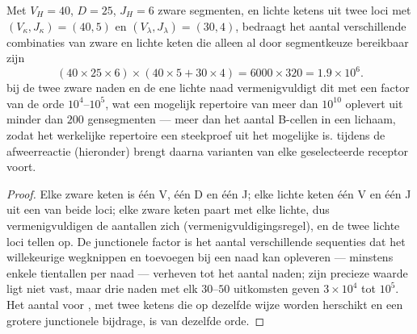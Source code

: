 \begin{theorem}\label{thm:b3:adaptive-immunity:repertoire}
Met $V_{H} = 40$, $D = 25$, $J_{H} = 6$ zware segmenten, en lichte
ketens uit twee loci met $(V_{\kappa}, J_{\kappa}) = (40, 5)$ en
$(V_{\lambda}, J_{\lambda}) = (30, 4)$, bedraagt het aantal
verschillende combinaties van zware en lichte keten die alleen al door
segmentkeuze bereikbaar zijn
\[
(40\times 25\times 6)\times(40\times 5 + 30\times 4) = 6000\times 320
= 1.9\times 10^{6}.
\]
 bij de twee zware naden en de ene lichte naad
vermenigvuldigt dit met een factor van de orde $10^{4}$--$10^{5}$, wat
een mogelijk repertoire van meer dan $10^{10}$ oplevert uit minder dan
$200$ gensegmenten --- meer dan het aantal B-cellen in een lichaam,
zodat het werkelijke repertoire een steekproef uit het mogelijke is.
 tijdens de afweerreactie (hieronder) brengt
daarna varianten van elke geselecteerde receptor voort.
\end{theorem}
\begin{proof}
Elke zware keten is één V, één D en één J; elke lichte keten één V en
één J uit een van beide loci; elke zware keten paart met elke lichte,
dus vermenigvuldigen de aantallen zich (vermenigvuldigingsregel), en de
twee lichte loci tellen op. De junctionele factor is het aantal
verschillende sequenties dat het willekeurige wegknippen en toevoegen
bij een naad kan opleveren --- minstens enkele tientallen per naad ---
verheven tot het aantal naden; zijn precieze waarde ligt niet vast,
maar drie naden met elk $30$--$50$ uitkomsten geven $3\times 10^{4}$
tot $10^{5}$. Het aantal voor , met twee ketens die op
dezelfde wijze worden herschikt en een grotere junctionele bijdrage, is
van dezelfde orde.
\end{proof}

